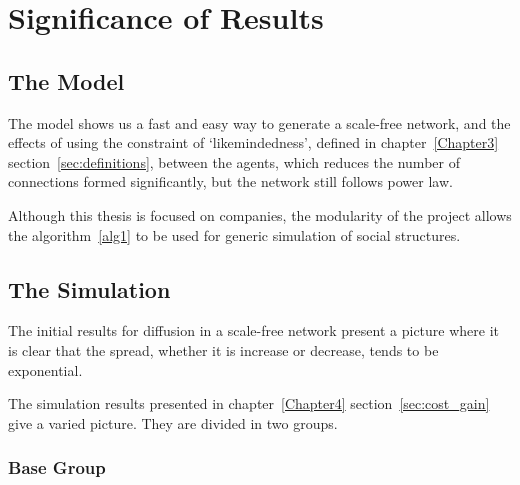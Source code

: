 
\chapter{Significance of Results} %

\label{Chapter5} %



\section{The Model}
The model shows us a fast and easy way to generate a scale-free network, and the effects of using the constraint of `likemindedness', defined in chapter~\ref{Chapter3} section~\ref{sec:definitions}, between the agents, which reduces the number of connections formed significantly, but the network still follows power law.

Although this thesis is focused on companies, the modularity of the project allows the algorithm~\ref{alg1} to be used for generic simulation of social structures.


\section{The Simulation}

The initial results for diffusion in a scale-free network present a picture where it is clear that the spread, whether it is increase or decrease, tends to be exponential. 

The simulation results presented in chapter~\ref{Chapter4} section~\ref{sec:cost_gain} give a varied picture. They are divided in two groups.

\subsection{Base Group}

